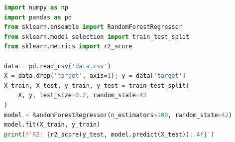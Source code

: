 \vspace{1.1em}

\begin{lstlisting}[language=Python]
import numpy as np
import pandas as pd
from sklearn.ensemble import RandomForestRegressor
from sklearn.model_selection import train_test_split
from sklearn.metrics import r2_score

data = pd.read_csv('data.csv')
X = data.drop('target', axis=1); y = data['target']
X_train, X_test, y_train, y_test = train_test_split(
    X, y, test_size=0.2, random_state=42
)
model = RandomForestRegressor(n_estimators=100, random_state=42)
model.fit(X_train, y_train)
print(f'R2: {r2_score(y_test, model.predict(X_test)):.4f}')
\end{lstlisting}
